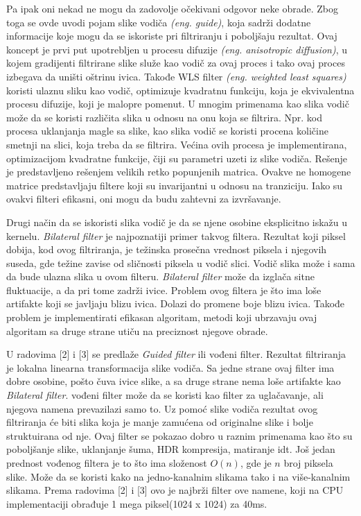 \documentclass[a4paper,12pt,titlepage]{article}
\begin{document}
Pa ipak oni nekad ne mogu da zadovolje očekivani odgovor neke obrade. Zbog toga se ovde uvodi pojam slike vodiča \emph{(eng. guide)}, koja sadrži dodatne informacije koje mogu da se iskoriste pri filtriranju i poboljšaju rezultat. Ovaj koncept je prvi put upotrebljen u procesu difuzije \emph{(eng. anisotropic diffusion)}, u kojem gradijenti filtrirane slike služe kao vodič za ovaj proces i tako ovaj proces izbegava da uništi oštrinu ivica. Takođe WLS filter \emph{(eng. weighted least squares)} koristi ulaznu sliku kao vodič, optimizuje kvadratnu funkciju, koja je ekvivalentna procesu difuzije, koji je malopre pomenut. U mnogim primenama kao slika vodič može da se koristi različita slika u odnosu na onu koja se filtrira. Npr. kod procesa uklanjanja magle sa slike, kao slika vodič se koristi procena količine smetnji na slici, koja treba da se filtrira. Većina ovih procesa je implementirana, optimizacijom kvadratne funkcije, čiji su parametri uzeti iz slike vodiča. Rešenje je predstavljeno rešenjem velikih retko popunjenih matrica. Ovakve ne homogene matrice predstavljaju filtere koji su invarijantni u odnosu na tranziciju. Iako su ovakvi filteri efikasni, oni mogu da budu zahtevni za izvršavanje.

Drugi način da se iskoristi slika vodič je da se njene osobine eksplicitno iskažu u kernelu. \emph{Bilateral filter} je najpoznatiji primer takvog filtera. Rezultat koji piksel dobija, kod ovog filtriranja, je težinska prosečna vrednost piksela i njegovih suseda, gde težine zavise od sličnosti piksela u vodič slici. Vodič slika može i sama da bude ulazna slika u ovom filteru. \emph{Bilateral filter} može da izglača sitne fluktuacije, a da pri tome zadrži ivice. Problem ovog filtera je što ima loše artifakte koji se javljaju blizu ivica. Dolazi do promene boje blizu ivica. Takođe problem je implementirati efikasan algoritam, metodi koji ubrzavaju ovaj algoritam sa druge strane utiču na preciznost njegove obrade.

U radovima [2] i [3] se predlaže \emph{Guided filter} ili vođeni filter. Rezultat filtriranja je lokalna linearna transformacija slike vodiča. Sa jedne strane ovaj filter ima dobre osobine, pošto čuva ivice slike, a sa druge strane nema loše artifakte kao \emph{Bilateral filter}. vođeni filter može da se koristi kao filter za uglačavanje, ali njegova namena prevazilazi samo to. Uz pomoć slike vodiča rezultat ovog filtriranja će biti slika koja je manje zamućena od originalne slike i bolje struktuirana od nje. Ovaj filter se pokazao dobro u raznim primenama kao što su poboljšanje slike, uklanjanje šuma, HDR kompresija, matiranje idt. Još jedan prednost vođenog filtera je to što ima složenost $O(n)$, gde je $n$ broj piksela slike. Može da se koristi kako na jedno-kanalnim slikama tako i na više-kanalnim slikama. Prema radovima [2] i [3] ovo je najbrži filter ove namene, koji na CPU implementaciji obrađuje 1 mega piksel(1024 x 1024) za 40ms. 
\end{document}
